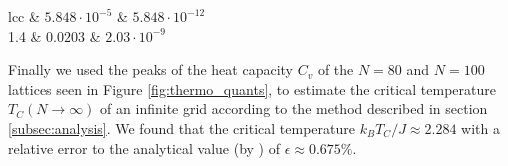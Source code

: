 \documentclass[twocolumn]{aastex62}
\begin{document}
\begin{deluxetable}{lcc}
	 & $5.848\cdot 10^{-5}$ & $5.848\cdot 10^{-12}$ \\
	1.4 & $0.0203$ & $2.03\cdot 10^{-9}$
	\enddata
\end{deluxetable}
Finally we used the peaks of the heat capacity $C_v$ of the $N = 80$ and $N =
100$ lattices seen in Figure \ref{fig:thermo_quants}, to estimate the critical
temperature $T_C(N\to\infty)$ of an infinite grid according to the method
described in section \ref{subsec:analysis}. We found that the critical
temperature $k_BT_C / J \approx 2.284$ with a relative error to the
analytical value (by \cite{onsager:1944}) of $\epsilon \approx 0.675\%$.
\end{document}
